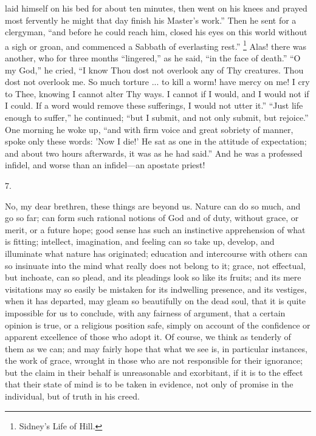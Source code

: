 laid himself on his bed for about ten minutes, then went on his knees
and prayed most fervently he might that day finish his Master's
work.'' Then he sent for a clergyman, ``and before he could
reach him, closed his eyes on this world without a sigh or groan, and
commenced a Sabbath of everlasting rest.'' \footnote{Sidney's Life of Hill.} Alas! there was another, who for three months
``lingered,'' as he said, ``in the face of death.''
``O my God,'' he cried, ``I know Thou dost not overlook
any of Thy creatures. Thou dost not overlook me. So much torture ...
to kill a worm! have mercy on me! I cry to Thee, knowing I cannot
alter Thy ways. I cannot if I would, and I would not if I could. If a
word would remove these sufferings, I would not utter it.''
``Just life enough to suffer,'' he continued; ``but I
submit, and not only submit, but rejoice.'' One morning he woke
up, ``and with firm voice and great sobriety of manner, spoke only
these words: 'Now I die!' He sat as one in the attitude of
expectation; and about two hours afterwards, it was as he had
said.'' And he was a professed infidel, and worse than an infidel—an
apostate priest!

7.

No, my dear brethren, these things are beyond us. Nature can do so
much, and go so far; can form such rational notions of God and of
duty, without grace, or merit, or a future hope; good sense has such
an instinctive apprehension of what is fitting; intellect,
imagination, and feeling can so take up, develop, and illuminate what
nature has originated; education and intercourse with others can so
insinuate into the mind what really does not belong to it; grace, not
effectual, but inchoate, can so plead, and its pleadings look so like
its fruits; and its mere visitations may so easily be mistaken for its
indwelling presence, and its vestiges, when it has departed, may gleam
so beautifully on the dead soul, that it is quite impossible for us to
conclude, with any fairness of argument, that a certain opinion is
true, or a religious position safe, simply on account of the
confidence or apparent excellence of those who adopt it. Of course, we
think as tenderly of them as we can; and may fairly hope that what we
see is, in particular instances, the work of grace, wrought in those
who are not responsible for their ignorance; but the claim in their
behalf is unreasonable and exorbitant, if it is to the effect that
their state of mind is to be taken in evidence, not only of promise in
the individual, but of truth in his creed.

